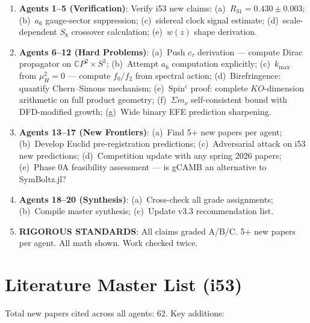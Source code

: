 \documentclass[11pt,a4paper]{article}
\newcommand{\CP}{\mathbb{C}P}
\begin{document}
\begin{enumerate}
\item \textbf{Agents 1--5 (Verification)}: Verify i53 new claims: (a)~$R_{31} = 0.430 \pm 0.003$; (b)~$a_6$ gauge-sector suppression; (c)~sidereal clock signal estimate; (d)~scale-dependent $S_8$ crossover calculation; (e)~$w(z)$ shape derivation.
\item \textbf{Agents 6--12 (Hard Problems)}: (a)~Push $c_\tau$ derivation --- compute Dirac propagator on $\CP^2 \times S^3$; (b)~Attempt $a_6$ computation explicitly; (c)~$k_{\max}$ from $\mu_H^2 = 0$ --- compute $f_0/f_2$ from spectral action; (d)~Birefringence: quantify Chern--Simons mechanism; (e)~Spin$^c$ proof: complete $KO$-dimension arithmetic on full product geometry; (f)~$\Sigma m_\nu$ self-consistent bound with DFD-modified growth; (g)~Wide binary EFE prediction sharpening.
\item \textbf{Agents 13--17 (New Frontiers)}: (a)~Find 5+ new papers per agent; (b)~Develop Euclid pre-registration predictions; (c)~Adversarial attack on i53 new predictions; (d)~Competition update with any spring 2026 papers; (e)~Phase 0A feasibility assessment --- is gCAMB an alternative to SymBoltz.jl?
\item \textbf{Agents 18--20 (Synthesis)}: (a)~Cross-check all grade assignments; (b)~Compile master synthesis; (c)~Update v3.3 recommendation list.
\item \textbf{RIGOROUS STANDARDS}: All claims graded A/B/C. 5+ new papers per agent. All math shown. Work checked twice.
\end{enumerate}


\section{Literature Master List (i53)}
\label{sec:literature}

Total new papers cited across all agents: 62. Key additions:
\end{document}
